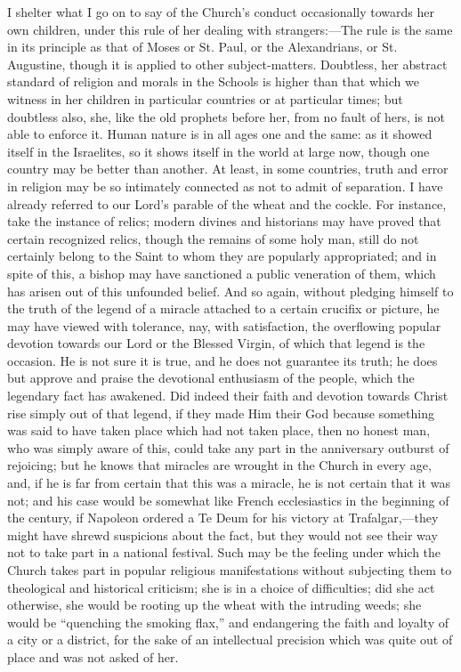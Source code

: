 I shelter what I go on to say of the Church's conduct occasionally
towards her own children, under this rule of her dealing with
strangers:—The rule is the same in its principle as that of Moses or
St. Paul, or the Alexandrians, or St. Augustine, though it is
applied to other subject-matters. Doubtless, her abstract standard of
religion and morals in the Schools is higher than that which we
witness in her children in particular countries or at particular
times; but doubtless also, she, like the old prophets before her, from
no fault of hers, is not able to enforce it. Human nature is in all
ages one and the same: as it showed itself in the Israelites, so it
shows itself in the world at large now, though one country may be
better than another. At least, in some countries, truth and error in
religion may be so intimately connected as not to admit of separation.
I have already referred to our Lord's parable of the wheat and the
cockle. For instance, take the instance of relics; modern divines and
historians may have proved that certain recognized relics, though the
remains of some holy man, still do not certainly belong to the Saint
to whom they are popularly appropriated; and in spite of this, a
bishop may have sanctioned a public veneration of them, which has
arisen out of this unfounded belief. And so again, without pledging
himself to the truth of the legend of a miracle attached to a certain
crucifix or picture, he may have viewed with tolerance, nay, with
satisfaction, the overflowing popular devotion towards our Lord or the
Blessed Virgin, of which that legend is the occasion. He is not
sure it is true, and he does not guarantee its truth; he does but
approve and praise the devotional enthusiasm of the people, which the
legendary fact has awakened. Did indeed their faith and devotion
towards Christ rise simply out of that legend, if they made Him their
God because something was said to have taken place which had not taken
place, then no honest man, who was simply aware of this, could take
any part in the anniversary outburst of rejoicing; but he knows that
miracles are wrought in the Church in every age, and, if he is far
from certain that this was a miracle, he is not certain that it was
not; and his case would be somewhat like French ecclesiastics in the
beginning of the century, if Napoleon ordered a Te Deum for his
victory at Trafalgar,—they might have shrewd suspicions about the
fact, but they would not see their way not to take part in a national
festival. Such may be the feeling under which the Church takes part in
popular religious manifestations without subjecting them to
theological and historical criticism; she is in a choice of
difficulties; did she act otherwise, she would be rooting up the wheat
with the intruding weeds; she would be ``quenching the smoking
flax,'' and endangering the faith and loyalty of a city or a
district, for the sake of an intellectual precision which was quite
out of place and was not asked of her.

